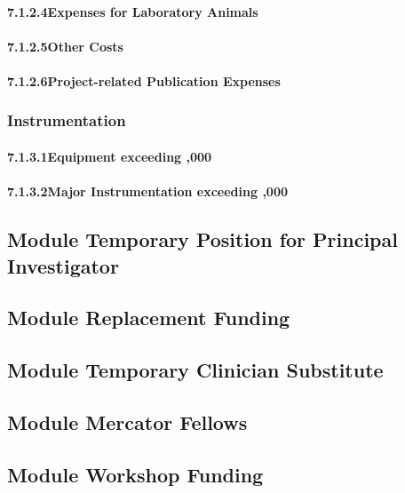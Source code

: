 \paragraph{7.1.2.4\quad Expenses for Laboratory Animals}

\paragraph{7.1.2.5\quad Other Costs}

\paragraph{7.1.2.6\quad Project-related Publication Expenses}

\subsubsection{Instrumentation}

\paragraph{7.1.3.1\quad Equipment exceeding ,000}

\paragraph{7.1.3.2\quad Major Instrumentation exceeding ,000}

\subsection{Module Temporary Position for Principal Investigator}

\subsection{Module Replacement Funding}

\subsection{Module Temporary Clinician Substitute}

\subsection{Module Mercator Fellows}

\subsection{Module Workshop Funding}

